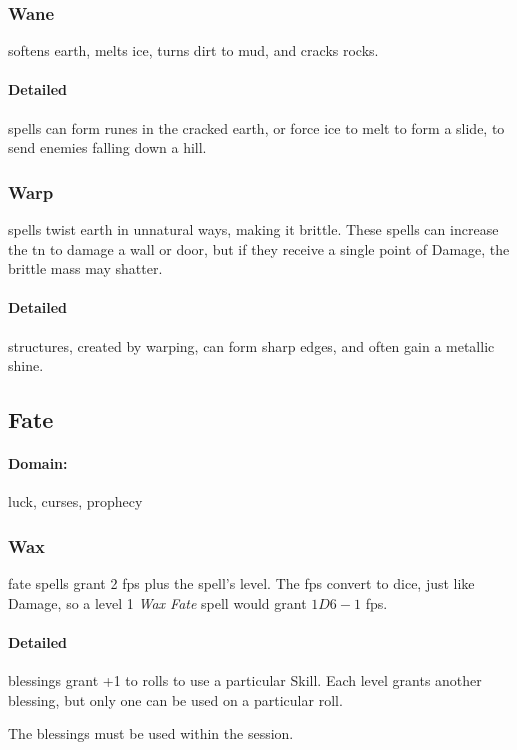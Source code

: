 \begin{multicols}{2}
\subsubsection{Wane}
softens earth, melts ice, turns dirt to mud, and cracks rocks.

\paragraph{Detailed}
spells can form runes in the cracked earth, or force ice to melt to form a slide, to send enemies falling down a hill.

\subsubsection{Warp}
spells twist earth in unnatural ways, making it brittle.
These spells can increase the \gls{tn} to damage a wall or door, but if they receive a single point of Damage, the brittle mass may shatter.

\paragraph{Detailed}
structures, created by warping, can form sharp edges, and often gain a metallic shine.

\subsection{Fate}
\paragraph{Domain:}
luck, curses, prophecy

\subsubsection{Wax}
fate spells grant 2 \glspl{fp} plus the spell's level.
The \glspl{fp} convert to dice, just like Damage, so a level 1 \textit{Wax Fate} spell would grant $1D6-1$ \glspl{fp}.

\paragraph{Detailed}
blessings grant +1 to rolls to use a particular Skill.
Each level grants another blessing, but only one can be used on a particular roll.

The blessings must be used within the session.


\end{multicols}
